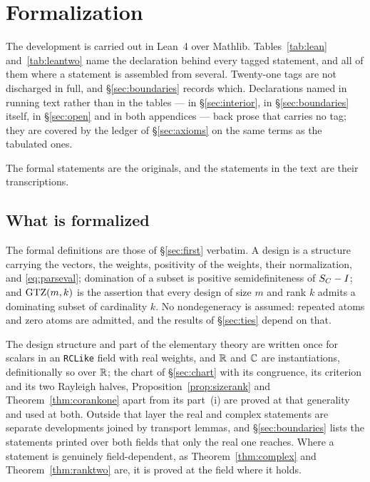 \section{Formalization}\label{sec:formalization}

The development is carried out in Lean~4 over Mathlib.
Tables~\ref{tab:lean} and~\ref{tab:leantwo} name the declaration behind
every tagged statement, and all of them where a statement is assembled from
several.  Twenty-one tags are not discharged in full, and
\S\ref{sec:boundaries} records which.  Declarations named in running text
rather than in the tables --- in \S\ref{sec:interior}, in
\S\ref{sec:boundaries} itself, in \S\ref{sec:open} and in both appendices
--- back prose that carries no tag; they are covered by the ledger of
\S\ref{sec:axioms} on the same terms as the tabulated ones.

The formal statements are the originals, and the statements in the text
are their transcriptions.

\subsection{What is formalized}\label{sec:whatformal}

The formal definitions are those of \S\ref{sec:first} verbatim.  A design is a
structure carrying the vectors, the weights, positivity of the weights, their
normalization, and \eqref{eq:parseval}; domination of a subset is positive
semidefiniteness of $S_{C}-I$; and $\mathrm{GTZ}(m,k)$ is the assertion that every
design of size $m$ and rank $k$ admits a dominating subset of cardinality $k$.
No nondegeneracy is assumed: repeated atoms and zero atoms are admitted, and
the results of \S\ref{sec:ties} depend on that.

The design structure and part of the elementary theory are written once for
scalars in an \texttt{RCLike} field with real weights, and $\mathbb{R}$ and $\mathbb{C}$ are
instantiations, definitionally so over $\mathbb{R}$; the chart of \S\ref{sec:chart}
with its congruence, its criterion and its two Rayleigh halves,
Proposition~\ref{prop:sizerank} and Theorem~\ref{thm:corankone} apart from
its part~(i) are proved at that generality and used at both.  Outside that layer the real and complex
statements are separate developments joined by transport lemmas, and
\S\ref{sec:boundaries} lists the statements printed over both fields that only
the real one reaches.  Where a statement is genuinely
field-dependent, as Theorem~\ref{thm:complex} and Theorem~\ref{thm:ranktwo}
are, it is proved at the field where it holds.

